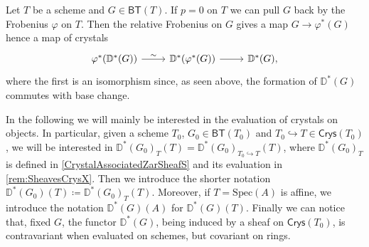 \begin{rem}[]
	Let $T$ be a scheme and $G \in \mathsf{BT}(T)$.
	If $p = 0$ on $T$ we can pull $G$ back by the Frobenius $\varphi$ on $T$.
	Then the relative Frobenius on $G$ gives a map $G \to \varphi^*(G)$
	hence a map of crystals
	\begin{equation*}
	\begin{tikzcd}
		\varphi^* (\mathbb{D}^*(G)) \arrow[r, "\sim", rightarrow] &
		\mathbb{D}^*(\varphi^*(G)) \arrow[r, "", rightarrow] &
		\mathbb{D}^*(G)
	,\end{tikzcd}
	\end{equation*}
	where the first is an isomorphism since, as seen above, the formation of
	$\mathbb{D}^*(G)$ commutes with base change.
\end{rem}


\begin{ntt}[]
	In the following we will mainly be interested in the evaluation of
	crystals on objects.
	In particular, given a scheme $T_0$, $G_0 \in \mathsf{BT}(T_0)$ and 
	$T_0 \hookrightarrow T \in \mathsf{Crys}(T_0)$, we will be interested
	in $\mathbb{D}^*(G_0)_{T}(T) = \mathbb{D}^*(G_0)_{T_0 \hookrightarrow T}(T)$,
	where $\mathbb{D}^*(G_0)_T$ is defined in \cref{CrystalAssociatedZarSheafS}
	and its evaluation in \cref{rem:SheavesCrysX}.
	Then we introduce the shorter notation
	$\mathbb{D}^*(G_0)(T) \coloneqq \mathbb{D}^*(G_0)_T(T)$.
	Moreover, if $T = \mathrm{Spec}(A)$ is affine, we introduce the notation
	$\mathbb{D}^*(G)(A)$ for $\mathbb{D}^*(G)(T)$.
	Finally we can notice that, fixed $G$, the functor $\mathbb{D}^*(G)$,
	being induced by a sheaf on $\mathsf{Crys}(T_0)$,
	is contravariant when evaluated on schemes, but covariant on rings.
\end{ntt}


